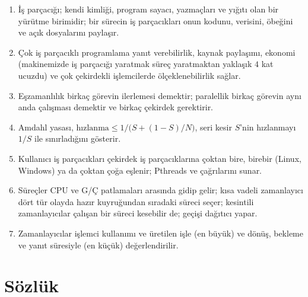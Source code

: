 \begin{keyidea}
\begin{enumerate}[leftmargin=1.4em]
  \item İş parçacığı; kendi kimliği, program sayacı, yazmaçları ve yığıtı olan bir yürütme birimidir; bir sürecin iş parçacıkları onun kodunu, verisini, öbeğini ve açık dosyalarını paylaşır.
  \item Çok iş parçacıklı programlama yanıt verebilirlik, kaynak paylaşımı, ekonomi (makinemizde iş parçacığı yaratmak süreç yaratmaktan yaklaşık $4$ kat ucuzdu) ve çok çekirdekli işlemcilerde ölçeklenebilirlik sağlar.
  \item Eşzamanlılık birkaç görevin ilerlemesi demektir; paralellik birkaç görevin aynı anda çalışması demektir ve birkaç çekirdek gerektirir.
  \item Amdahl yasası, $\text{hızlanma} \le 1/\bigl(S + (1-S)/N\bigr)$, seri kesir $S$'nin hızlanmayı $1/S$ ile sınırladığını gösterir.
  \item Kullanıcı iş parçacıkları çekirdek iş parçacıklarına çoktan bire, birebir (Linux, Windows) ya da çoktan çoğa eşlenir; Pthreads  ve  çağrılarını sunar.
  \item Süreçler CPU ve G/Ç patlamaları arasında gidip gelir; kısa vadeli zamanlayıcı dört tür olayda hazır kuyruğundan sıradaki süreci seçer; kesintili zamanlayıcılar çalışan bir süreci kesebilir de; geçişi dağıtıcı yapar.
  \item Zamanlayıcılar işlemci kullanımı ve üretilen işle (en büyük) ve dönüş, bekleme ve yanıt süresiyle (en küçük) değerlendirilir.
\end{enumerate}
\end{keyidea}

\section{Sözlük}

